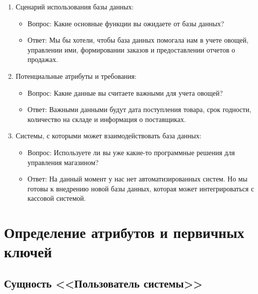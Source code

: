 \documentclass[14pt]{extreport}
\begin{document}
\begin{enumerate}
            \item{Сценарий использования базы данных:}
            \begin{itemize}
                \item Вопрос: Какие основные функции вы ожидаете от базы данных?
                \item Ответ: Мы бы хотели, чтобы база данных помогала нам в учете овощей, управлении ими, формировании заказов и предоставлении отчетов о продажах.
            \end{itemize}

            \item{Потенциальные атрибуты и требования:}
            \begin{itemize}
                \item Вопрос: Какие данные вы считаете важными для учета овощей?
                \item Ответ: Важными данными будут дата поступления товара, срок годности, количество на складе и информация о поставщиках.
            \end{itemize}

            \item{Системы, с которыми может взаимодействовать база данных:}
            \begin{itemize}
                \item Вопрос: Используете ли вы уже какие-то программные решения для управления магазином?
                \item Ответ: На данный момент у нас нет автоматизированных систем. Но мы готовы к внедрению новой базы данных, которая может интегрироваться с кассовой системой.
            \end{itemize}
        \end{enumerate}
    
    \section{Определение атрибутов и первичных ключей}

    \subsection*{Сущность <<Пользователь системы>>}
\end{document}
